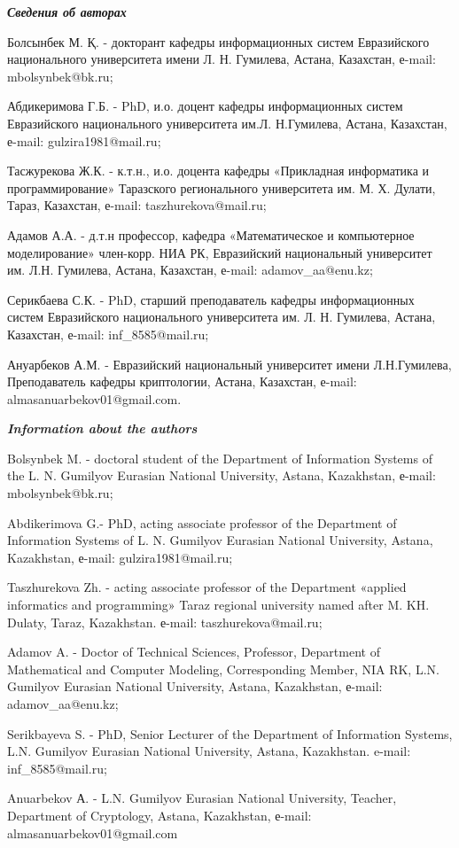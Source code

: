 \begin{authorinfo}
\emph{{\bfseries Сведения об авторах}}

Болсынбек М. Қ. - докторант кафедры информационных систем Евразийского
национального университета имени Л. Н. Гумилева, Астана, Казахстан,
е-mail: mbolsynbek@bk.ru;

Абдикеримова Г.Б. - PhD, и.о. доцент кафедры информационных систем
Евразийского национального университета им.Л. Н.Гумилева, Астана,
Казахстан, е-mail: gulzira1981@mail.ru;

Тасжурекова Ж.К. - к.т.н., и.о. доцента кафедры «Прикладная
информатика и программирование» Таразского регионального университета
им. М. Х. Дулати, Тараз, Казахстан, е-mail: taszhurekova@mail.ru; 

Адамов А.А. - д.т.н профессор, кафедра «Математическое и
компьютерное моделирование» член-корр. НИА РК, Евразийский национальный
университет им. Л.Н. Гумилева, Астана, Казахстан, е-mail: adamov\_aa@enu.kz;

Серикбаева С.К. - PhD, старший преподаватель кафедры информационных
систем Евразийского национального университета им. Л. Н. Гумилева,
Астана, Казахстан, е-mail: inf\_8585@mail.ru;

Ануарбеков А.М. - Евразийский национальный университет имени
Л.Н.Гумилева, Преподаватель кафедры криптологии, Астана, Казахстан,
е-mail: almasanuarbekov01@gmail.com.

\emph{{\bfseries Information about the authors}}

Bolsynbek M. - doctoral student of the Department of Information Systems
of the L. N. Gumilyov Eurasian National University, Astana, Kazakhstan,
е-mail: mbolsynbek@bk.ru;

Abdikerimova G.- PhD, acting associate professor of the Department of
Information Systems of L. N. Gumilyov Eurasian National University,
Astana, Kazakhstan, е-mail: gulzira1981@mail.ru;

Taszhurekova Zh. - acting associate professor of the Department «applied
informatics and programming» Taraz regional university named after M.
KH. Dulaty, Taraz, Kazakhstan. е-mail: taszhurekova@mail.ru; 

Adamov A. - Doctor of Technical Sciences, Professor, Department of
Mathematical and Computer Modeling, Corresponding Member, NIA RK, L.N.
Gumilyov Eurasian National University, Astana, Kazakhstan, е-mail:
adamov\_aa@enu.kz;

Serikbayeva S. - PhD, Senior Lecturer of the Department of Information
Systems, L.N. Gumilyov Eurasian National University, Astana, Kazakhstan.
e-mail: inf\_8585@mail.ru;

Anuarbekov А. - L.N. Gumilyov Eurasian National University, Teacher,
Department of Cryptology, Astana, Kazakhstan, е-mail:
almasanuarbekov01@gmail.com
\end{authorinfo}
